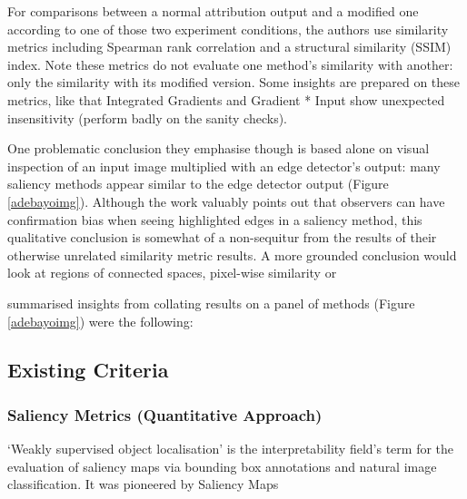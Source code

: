 \documentclass[main]{subfiles}
\begin{document}
For comparisons between a normal attribution output and a modified one according to one of those two experiment conditions, the authors use similarity metrics including Spearman rank correlation and a structural similarity (SSIM) index. Note these metrics do not evaluate one method's similarity with another: only the similarity with its modified version. Some insights are prepared on these metrics, like that Integrated Gradients and Gradient * Input show unexpected insensitivity (perform badly on the sanity checks). 

One problematic conclusion they emphasise though is based alone on visual inspection of an input image multiplied with an edge detector's output: many saliency methods appear similar to the edge detector output (Figure \ref{adebayoimg}). Although the work valuably points out that observers can have confirmation bias when seeing highlighted edges in a saliency method, this qualitative conclusion is somewhat of a non-sequitur from the results of their otherwise unrelated similarity metric results. A more grounded conclusion would look at regions of connected spaces, pixel-wise similarity or 


 summarised insights from collating results on a panel of methods (Figure \ref{adebayoimg}) were the following:






\subsection{Existing Criteria} \label{sec:existing_criteria}




\subsubsection{Saliency Metrics (Quantitative Approach)}

`Weakly supervised object localisation' is the interpretability field's term for the evaluation of saliency maps via bounding box annotations and natural image classification. It was pioneered by Saliency Maps
\end{document}
